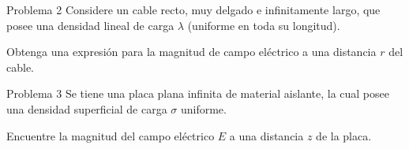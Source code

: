 \documentclass[10pt,aspectratio=169]{beamer}
\begin{document}
\begin{frame}{Problema 2}
    Considere un cable recto, muy delgado e infinitamente largo, que posee una densidad lineal de carga $\lambda$ (uniforme en toda su longitud).

    Obtenga una expresión para la magnitud de campo eléctrico a una distancia $r$ del cable.

    \begin{figure}[H]
        \centering
    \end{figure}
\end{frame}

\begin{frame}{Problema 3}
    Se tiene una placa plana infinita de material aislante, la cual posee una densidad superficial de carga $\sigma$ uniforme.

    Encuentre la magnitud del campo eléctrico $E$ a una distancia $z$ de la placa.

    \begin{figure}[H]
        \centering
    \end{figure}
\end{frame}
\end{document}

